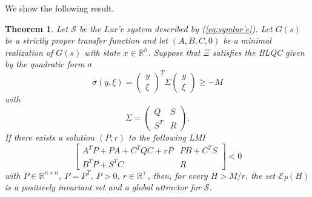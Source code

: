 \documentclass[letterpaper,10pt,conference,twocolumn]{IEEEtran}
\newtheorem{thm}{Theorem}[section]
\newcommand{\Csi}{\Xi}
\newcommand{\Real}{\mathbb{R}}
\newcommand{\ellips}{\mathcal{E}}
\begin{document}
We show the following result.
\begin{thm}\label{thm:bottle_blq}
	Let $\mathcal{S}$ be the Lur'e system described by (\ref{eq:symlur'e}). Let $G(s)$ be a strictly proper transfer function and let $(A,B,C,0)$ be
	a minimal realization of $G(s)$ with state $x \in \Real^{n}$.
	Suppose that $\Csi$ satisfies the BLQC given by the quadratic form $\sigma$
	\begin{equation*}
		\sigma(y,\xi)=
			\left(
				\begin{array}{c}
					y \\
					\xi
				\end{array}
			\right)^T
			\Sigma
			\left(
				\begin{array}{c}
					y \\
					\xi
				\end{array}
			\right)
			\geq -M
	\end{equation*}
	with 
	\begin{equation*}
		\Sigma=
		\left(
			\begin{array}{cc}
				Q	& S \\
				S^T	& R
			\end{array}
		\right).
	\end{equation*}
	If there exists a solution $(P, r)$ to the following LMI
	\begin{equation*}
		\left[
			\begin{array}{cc}
				A^TP+PA+C^TQC+rP	& PB+C^TS \\
				B^TP+S^TC		& R
			\end{array}
		\right] < 0
	\end{equation*}
	with $P\in \Real^{n\times n}$, $P=P^T$, $P>0$, $r \in \Real^+$,
	then, for every $H>M/r$, the set $\ellips_P(H)$ is a positively invariant set and a global attractor for $\mathcal{S}$.
\end{thm}
\end{document}
